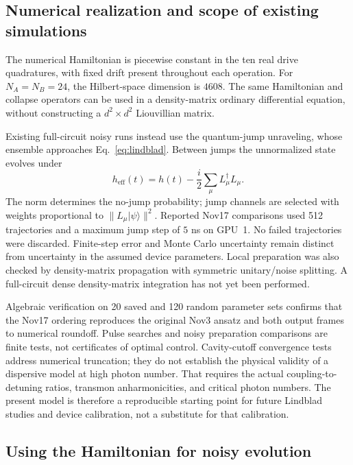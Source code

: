 \documentclass[aps,prb,reprint,amsmath,amssymb,nofootinbib]{revtex4-2}
\newcommand{\ket}[1]{\lvert#1\rangle}
\begin{document}
\subsection{Numerical realization and scope of existing simulations}

The numerical Hamiltonian is piecewise constant in the ten real drive
quadratures, with fixed drift present throughout each operation. For
$N_A=N_B=24$, the Hilbert-space dimension is $4608$. The same Hamiltonian
and collapse operators can be used in a density-matrix ordinary
differential equation, without constructing a $d^2\times d^2$
Liouvillian matrix.

Existing full-circuit noisy runs instead use the quantum-jump
unraveling,\cite{Dalibard1992} whose ensemble approaches
Eq.~\eqref{eq:lindblad}. Between jumps the unnormalized state evolves
under
\begin{equation}
 h_{\mathrm{eff}}(t)=h(t)-\frac{i}{2}\sum_\mu L_\mu^\dagger L_\mu.
\end{equation}
The norm determines the no-jump probability; jump channels are selected
with weights proportional to $\|L_\mu\ket\psi\|^2$.
Reported Nov17 comparisons used 512 trajectories and a maximum jump
step of $5$ ns on GPU~1. No failed trajectories were discarded.
Finite-step error and Monte Carlo uncertainty remain distinct from
uncertainty in the assumed device parameters. Local preparation was
also checked by density-matrix propagation with symmetric unitary/noise
splitting. A full-circuit dense density-matrix integration has not yet
been performed.

Algebraic verification on 20 saved and 120 random parameter sets confirms
that the Nov17 ordering reproduces the original Nov3 ansatz and both
output frames to numerical roundoff. Pulse searches and noisy
preparation comparisons are finite tests, not certificates of optimal
control. Cavity-cutoff convergence tests address numerical truncation;
they do not establish the physical validity of a dispersive model at
high photon number. That requires the actual coupling-to-detuning
ratios, transmon anharmonicities, and critical photon numbers.
The present model is therefore a reproducible starting point for future
Lindblad studies and device calibration, not a substitute for that
calibration.


\subsection{Using the Hamiltonian for noisy evolution}
\end{document}
